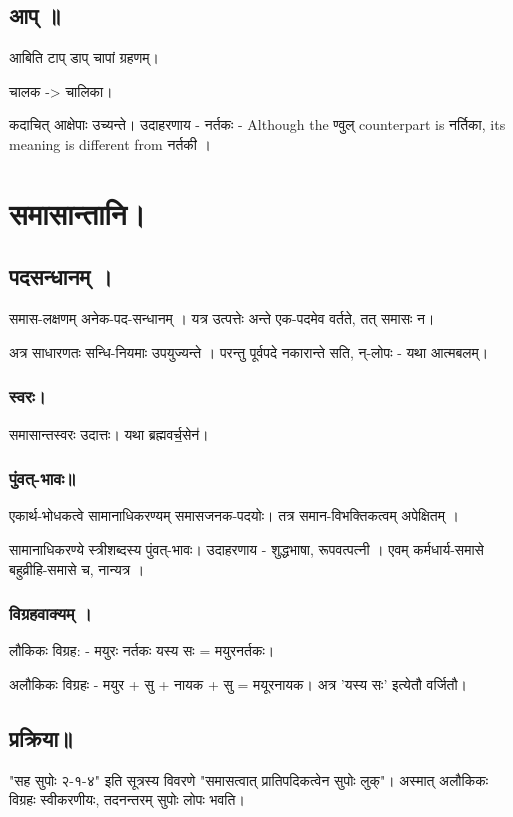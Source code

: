 \documentclass[oneside, article]{memoir}
\begin{document}
\subsection{आप् ॥}
आबिति टाप् डाप् चापां ग्रहणम्। 

चालक -> चालिका।

कदाचित् आक्षेपाः उच्यन्ते। उदाहरणाय - नर्तकः - Although the ण्वुल्  counterpart is नर्तिका, its meaning is
different from नर्तकी ।


\section{समासान्तानि।}
\subsection{पदसन्धानम् ।}
समास-लक्षणम् अनेक-पद-सन्धानम् । यत्र उत्पत्तेः अन्ते एक-पदमेव वर्तते, तत् समासः न।

अत्र साधारणतः सन्धि-नियमाः उपयुज्यन्ते । परन्तु पूर्वपदे नकारान्ते सति, न्-लोपः - यथा आत्मबलम्।

\subsubsection{स्वरः।}
समासान्तस्वरः उदात्तः। यथा ब्रह्मवर्च॒सेन॑।

\subsubsection{पुंवत्-भावः॥}
एकार्थ-भोधकत्वे सामानाधिकरण्यम् समासजनक-पदयोः। तत्र समान-विभक्तिकत्वम् अपेक्षितम् ।

सामानाधिकरण्ये स्त्रीशब्दस्य पुंवत्-भावः। उदाहरणाय - शुद्धभाषा, रूपवत्पत्नी । एवम् कर्मधार्य-समासे बहुव्रीहि-समासे च, नान्यत्र ।

\subsubsection{विग्रहवाक्यम् ।}
लौकिकः विग्रह: - मयुरः नर्तकः यस्य सः = मयुरनर्तकः।

अलौकिकः विग्रहः - मयुर + सु + नायक + सु = मयूरनायक। अत्र 'यस्य सः' इत्येतौ वर्जितौ।

\subsection{प्रक्रिया॥}
"सह सुपोः २-१-४" इति सूत्रस्य विवरणे "समासत्वात् प्रातिपदिकत्वेन सुपोः लुक्"। अस्मात् अलौकिकः विग्रहः स्वीकरणीयः, तदनन्तरम् सुपोः लोपः भवति।
\end{document}
